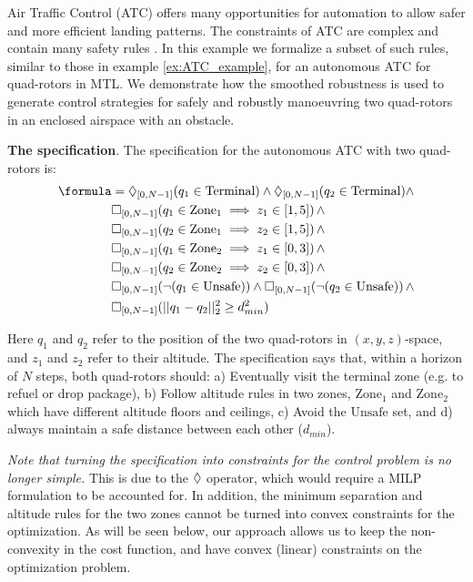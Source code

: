 Air Traffic Control (ATC) offers many opportunities for automation to allow safer and more efficient landing patterns. 
The constraints of ATC are complex and contain many safety rules \cite{Max_ICRAT16}.
In this example we formalize a subset of such rules, similar to those in example \ref{ex:ATC_example}, for an autonomous ATC for quad-rotors in MTL.
We demonstrate how the smoothed robustness is used to generate control strategies for safely and robustly manoeuvring two quad-rotors in an enclosed airspace with an obstacle. 

\textbf{The specification}.
The specification for the autonomous ATC with two quad-rotors is:
{\footnotesize
\begin{subequations}
\begin{align}
\formula &= \eventually_{[0,N-1]}(q_1 \in \text{Terminal}) \land \eventually_{[0,N-1]}(q_2 \in \text{Terminal}) \land   \nonumber \\
& \always_{[0,N-1]} (q_1 \in \text{Zone}_1 \implies z_1 \in [1,5]) \, \land \nonumber \\
& \always_{[0,N-1]} (q_2 \in \text{Zone}_1 \implies z_2 \in [1,5]) \, \land \nonumber \\
& \always_{[0,N-1]} (q_1 \in \text{Zone}_2 \implies z_1 \in [0,3]) \, \land \nonumber \\
& \always_{[0,N-1]} (q_2 \in \text{Zone}_2 \implies z_2 \in [0,3]) \, \land \nonumber \\
& \always_{[0,N-1]} (\neg (q_1 \in \text{Unsafe})) \land \always_{[0,N-1]} (\neg (q_2 \in \text{Unsafe})) \, \land  \nonumber \\
& \always_{[0,N-1]} (||q_1-q_2||_2^2 \geq d_{min}^2)
\end{align}
\end{subequations}
\vspace{-10pt}
}

Here $q_1$ and $q_2$ refer to the position of the two quad-rotors in $(x,y,z)$-space, and $z_1$ and $z_2$ refer to their altitude. 
The specification says that, within a horizon of $N$ steps,  both quad-rotors 
should: 
a) Eventually visit the terminal zone (e.g. to refuel or drop package), 
b) Follow altitude rules in two zones, $\text{Zone}_1$ and $\text{Zone}_2$ which have different altitude floors and ceilings,
c) Avoid the $\text{Unsafe}$ set, and d) always maintain a safe distance between each other ($d_{min}$). 

\textit{Note that turning the specification into constraints for the control problem is no longer simple.}
This is due to the $\Diamond$ operator, which would require a MILP formulation to be accounted for. 
In addition, the minimum separation and altitude rules for the two zones cannot be turned into convex constraints for the optimization. As will be seen below, our approach allows us to keep the non-convexity in the cost function, and have convex (linear) constraints on the optimization problem.

